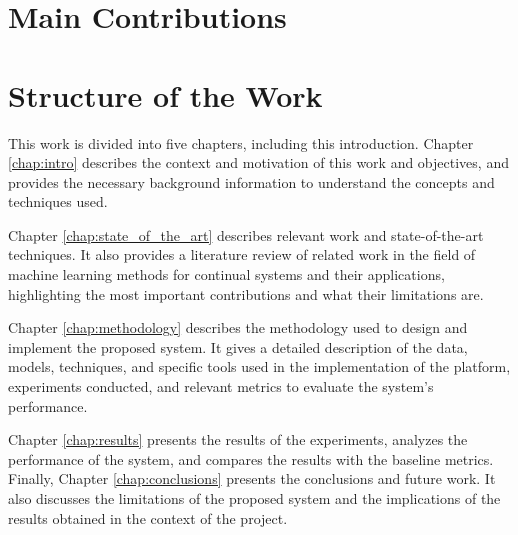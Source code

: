 \documentclass[../main.tex]{subfiles}
\begin{document}
    \section{Main Contributions} \label{sec:main_contributions}

    \section{Structure of the Work} \label{sec:structure_of_the_work}

    This work is divided into five chapters, including this introduction. Chapter \ref{chap:intro} describes the context and motivation of this work and objectives, and provides the necessary background information to understand the concepts and techniques used. 
    
    Chapter \ref{chap:state_of_the_art} describes relevant work and state-of-the-art techniques. It also provides a literature review of related work in the field of machine learning methods for continual systems and their applications, highlighting the most important contributions and what their limitations are.

    Chapter \ref{chap:methodology} describes the methodology used to design and implement the proposed system.  It gives a detailed description of the data, models, techniques, and specific tools used in the implementation of the platform, experiments conducted, and relevant metrics to evaluate the system's performance.
    
    Chapter \ref{chap:results} presents the results of the experiments, analyzes the performance of the system, and compares the results with the baseline metrics. Finally, Chapter \ref{chap:conclusions} presents the conclusions and future work. It also discusses the limitations of the proposed system and the implications of the results obtained in the context of the project.

    
    

\end{document}
